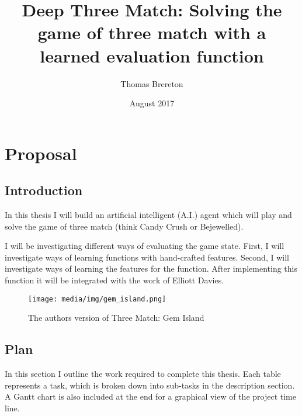 \documentclass{bhamthesis}
\title{Deep Three Match: Solving the game of three match with a learned evaluation function}
\author{Thomas Brereton}
\date{August 2017}  %
\makeatletter
\theoremstyle{definition}
\newcommand{\makecrestcover}{%
\begin{titlepage}
\centering\singlespacing
\vspace*{1cm}
{\huge\bfseries University of Birmingham\par}
\vspace*{2cm}
\texttt{[image: media/img/crest]}\par
\vspace*{\stretch{1}}
{\Huge\bfseries
\@author\par
\vspace{1cm}
\@title\par}
\vspace*{\stretch{1}}
{\Large\@date\par}
\end{titlepage}
}
\makeatother
\begin{document}
\frontmatter

\maketitle



\mainmatter
\chapter{Proposal}
\section{Introduction}
In this thesis I will build an artificial intelligent (A.I.) agent which will play and solve the game of three match (think Candy Crush or Bejewelled).

I will be investigating different ways of evaluating the game state. First, I will investigate ways of learning functions with hand-crafted features. Second, I will investigate ways of learning the features for the function. After implementing this function it will be integrated with the work of Elliott Davies.

\begin{figure}
\begin{center}
\texttt{[image: media/img/gem\_island.png]} 
\caption{The authors version of Three Match: Gem Island}
\label{f.gemisland}
\end{center}
\end{figure}



\section{Plan}

In this section I outline the work required to complete this thesis. Each table represents a task, which is broken down into sub-tasks in the description section. A Gantt chart is also included at the end for a graphical view of the project time line.
\end{document}
